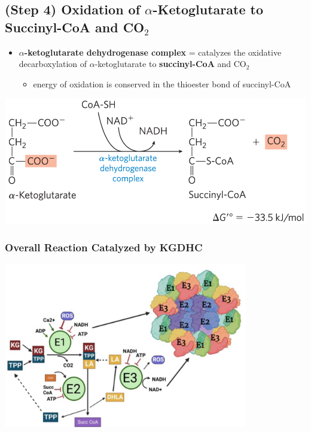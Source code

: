 \documentclass[10pt]{article}
\begin{document}
\subsection*{(Step 4) Oxidation of $\alpha$-Ketoglutarate to Succinyl-CoA and CO$_2$}
\begin{itemize}
	\item \textbf{$\alpha$-ketoglutarate dehydrogenase complex} = catalyzes the oxidative decarboxylation of $\alpha$-ketoglutarate to \textbf{succinyl-CoA} and CO$_2$
	\begin{itemize}
        \item energy of oxidation is conserved in the thioester bond of succinyl-CoA
    \end{itemize}
\end{itemize}
\begin{center} 
	\includegraphics*[width=\textwidth]{L4_7.png} 
\end{center}

\subsubsection*{Overall Reaction Catalyzed by KGDHC}
\begin{center} 
	\includegraphics*[width=0.8\textwidth]{L4_8.png} 
\end{center}
\end{document}
